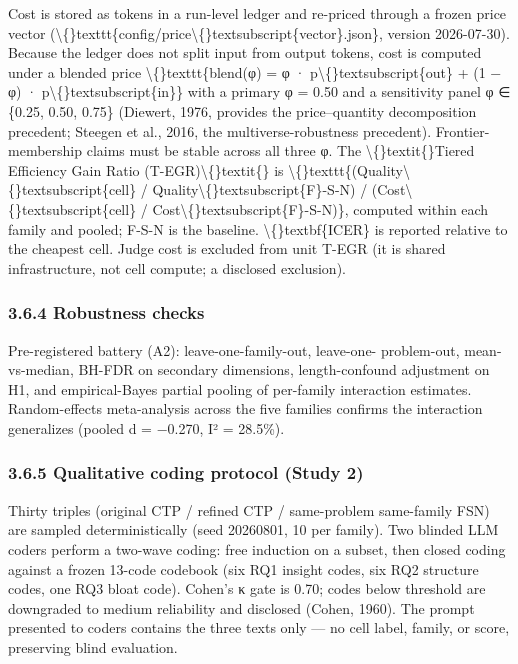 \documentclass[11pt,a4paper]{article}
\begin{document}
Cost is stored as tokens in a run-level ledger and re-priced through a
frozen price vector (\textbackslash\{\}texttt\{config/price\textbackslash\{\}textsubscript\{vector\}.json\}, version 2026-07-30).
Because the ledger does not split input from output tokens, cost is
computed under a blended price
\textbackslash\{\}texttt\{blend(φ) = φ · p\textbackslash\{\}textsubscript\{out\} + (1 − φ) · p\textbackslash\{\}textsubscript\{in\}\} with a primary φ = 0.50 and a
sensitivity panel φ ∈ \{0.25, 0.50, 0.75\} (Diewert, 1976, provides the
price–quantity decomposition precedent; Steegen et al., 2016, the
multiverse-robustness precedent). Frontier-membership claims must be
stable across all three φ. The \textbackslash\{\}textit\{\}Tiered Efficiency Gain Ratio
(T-EGR)\textbackslash\{\}textit\{\} is \textbackslash\{\}texttt\{(Quality\textbackslash\{\}textsubscript\{cell\} / Quality\textbackslash\{\}textsubscript\{F\}-S-N) / (Cost\textbackslash\{\}textsubscript\{cell\} / Cost\textbackslash\{\}textsubscript\{F\}-S-N)\},
computed within each family and pooled; F-S-N is the baseline.
\textbackslash\{\}textbf\{ICER\} is reported relative to the cheapest cell. Judge cost is
excluded from unit T-EGR (it is shared infrastructure, not cell
compute; a disclosed exclusion).

\subsubsection{3.6.4 Robustness checks}

Pre-registered battery (A2): leave-one-family-out, leave-one-
problem-out, mean-vs-median, BH-FDR on secondary dimensions,
length-confound adjustment on H1, and empirical-Bayes partial
pooling of per-family interaction estimates. Random-effects
meta-analysis across the five families confirms the interaction
generalizes (pooled d = −0.270, I² = 28.5\%).

\subsubsection{3.6.5 Qualitative coding protocol (Study 2)}

Thirty triples (original CTP / refined CTP / same-problem same-family
FSN) are sampled deterministically (seed 20260801, 10 per family).
Two blinded LLM coders perform a two-wave coding: free induction on
a subset, then closed coding against a frozen 13-code codebook
(six RQ1 insight codes, six RQ2 structure codes, one RQ3 bloat code).
Cohen's κ gate is 0.70; codes below threshold are downgraded to
medium reliability and disclosed (Cohen, 1960). The prompt presented
to coders contains the three texts only — no cell label, family, or
score, preserving blind evaluation.
\end{document}
